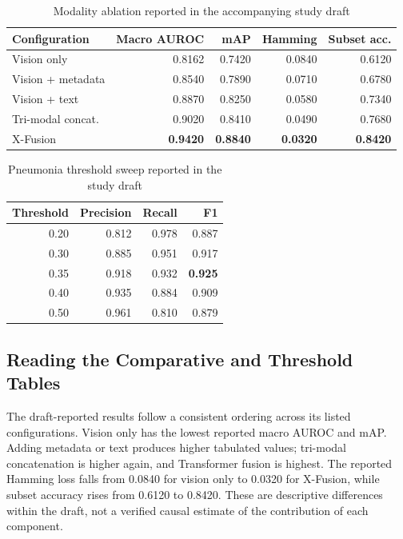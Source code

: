 \documentclass[conference,letterpaper]{IEEEtran}
\begin{document}
\begin{table}[t]
\caption{Modality ablation reported in the accompanying study draft}\label{tab:ablation}
\centering\scriptsize\setlength{\tabcolsep}{3pt}
\begin{tabular}{lrrrr}\toprule
Configuration & Macro AUROC & mAP & Hamming & Subset acc.\\\midrule
Vision only & 0.8162 & 0.7420 & 0.0840 & 0.6120\\
Vision + metadata & 0.8540 & 0.7890 & 0.0710 & 0.6780\\
Vision + text & 0.8870 & 0.8250 & 0.0580 & 0.7340\\
Tri-modal concat. & 0.9020 & 0.8410 & 0.0490 & 0.7680\\
X-Fusion & \textbf{0.9420} & \textbf{0.8840} & \textbf{0.0320} & \textbf{0.8420}\\\bottomrule
\end{tabular}
\end{table}

\begin{table}[t]
\caption{Pneumonia threshold sweep reported in the study draft}\label{tab:threshold}
\centering\footnotesize
\begin{tabular}{rrrr}\toprule
Threshold & Precision & Recall & F1\\\midrule
0.20 & 0.812 & 0.978 & 0.887\\
0.30 & 0.885 & 0.951 & 0.917\\
0.35 & 0.918 & 0.932 & \textbf{0.925}\\
0.40 & 0.935 & 0.884 & 0.909\\
0.50 & 0.961 & 0.810 & 0.879\\\bottomrule
\end{tabular}
\end{table}

\subsection{Reading the Comparative and Threshold Tables}
The draft-reported results follow a consistent ordering across its listed configurations. Vision only has the lowest reported macro AUROC and mAP. Adding metadata or text produces higher tabulated values; tri-modal concatenation is higher again, and Transformer fusion is highest. The reported Hamming loss falls from 0.0840 for vision only to 0.0320 for X-Fusion, while subset accuracy rises from 0.6120 to 0.8420. These are descriptive differences within the draft, not a verified causal estimate of the contribution of each component.
\end{document}
